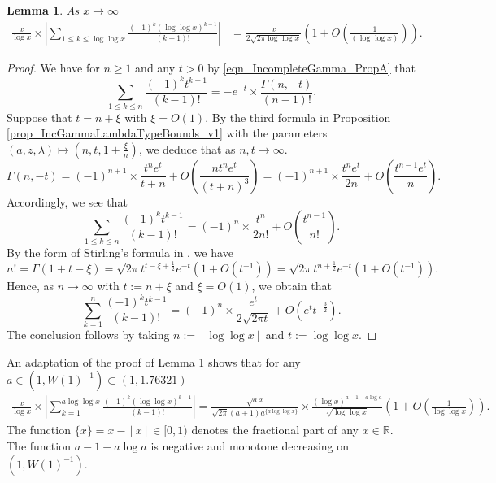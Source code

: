 \documentclass[11pt,reqno,a4letter]{article}
\newcommand{\hlocalref}[1]{\hyperref[#1]{\ref{#1}}}
\numberwithin{equation}{section}
\numberwithin{figure}{section}
\numberwithin{table}{section}
\newcommand{\cf}{\textit{cf.\ }}
\newcommand{\floor}[1]{\left\lfloor #1 \right\rfloor}
\theoremstyle{plain}
\newtheorem{lemma}[theorem]{Lemma}
\numberwithin{theorem}{section}
\theoremstyle{definition}
\begin{document}
\begin{lemma}
\label{lemma_ConvenientIncGammaFuncTypePartialSumAsymptotics_v2}
As $x \rightarrow \infty$  
\begin{align*}
\frac{x}{\log x} \times \left\lvert \sum_{1 \leq k \leq \log\log x} 
     \frac{(-1)^k (\log\log x)^{k-1}}{(k-1)!} \right\rvert 
     & = \frac{x}{2\sqrt{2\pi \log\log x}} 
     \left(1 + O\left(\frac{1}{(\log\log x)}\right)\right). 
\end{align*}
\end{lemma}
\begin{proof}
We have for $n \geq 1$ and any $t > 0$ by 
\eqref{eqn_IncompleteGamma_PropA} that 
\[
\sum_{1 \leq k \leq n} \frac{(-1)^k t^{k-1}}{(k-1)!} = -e^{-t} \times 
     \frac{\Gamma(n, -t)}{(n-1)!}. 
\]
Suppose that $t = n + \xi$ with $\xi = O(1)$. 
By the third formula 
in Proposition \hlocalref{prop_IncGammaLambdaTypeBounds_v1} 
with the parameters $(a, z, \lambda) \mapsto \left(n, t, 1 + \frac{\xi}{n}\right)$, 
we deduce that as $n,t \rightarrow \infty$. 
\begin{equation*}
\Gamma(n, -t) = (-1)^{n+1} \times \frac{t^n e^{t}}{t+n} + 
     O\left(\frac{n t^n e^{t}}{(t+n)^3}\right) = 
     (-1)^{n+1} \times \frac{t^n e^t}{2n} + O\left(\frac{t^{n-1} e^t}{n}\right). 
\end{equation*}
Accordingly, we see that 
\[
\sum_{1 \leq k \leq n} \frac{(-1)^k t^{k-1}}{(k-1)!} = 
     (-1)^{n} \times \frac{t^n}{2n!} + O\left(\frac{t^{n-1}}{n!}\right). 
\]
By the form of Stirling's formula in \cite[\cf Eq.\ (5.11.8)]{NISTHB}, we have 
\[
n! = \Gamma(1 + t - \xi) = \sqrt{2\pi} t^{t-\xi+\frac{1}{2}} e^{-t} \left(1 + O\left(t^{-1}\right)\right) = 
     \sqrt{2\pi} t^{n+\frac{1}{2}} e^{-t} \left(1 + O\left(t^{-1}\right)\right). 
\]
Hence, as $n \rightarrow \infty$ with $t := n + \xi$ and $\xi = O(1)$, we obtain that 
\[
\sum_{k=1}^{n} \frac{(-1)^k t^{k-1}}{(k-1)!} = (-1)^n \times \frac{e^t}{2 \sqrt{2\pi t}} + 
     O\left(e^t t^{-\frac{3}{2}}\right). 
\]
The conclusion follows by taking $n := \floor{\log\log x}$ and $t := \log\log x$. 
\end{proof}

An adaptation of the proof of 
Lemma \hlocalref{lemma_ConvenientIncGammaFuncTypePartialSumAsymptotics_v2} 
shows that for any $a \in \left(1, W(1)^{-1}\right) \subset (1, 1.76321)$ 
\begin{align*}
\frac{x}{\log x} \times \left\lvert \sum_{k=1}^{a \log\log x} 
     \frac{(-1)^{k} (\log\log x)^{k-1}}{(k-1)!} 
     \right\rvert = 
     \frac{\sqrt{a} x}{\sqrt{2\pi}(a+1) a^{\{a\log\log x\}}} 
     \times \frac{(\log x)^{a-1-a\log a}}{\sqrt{\log\log x}} 
     \left(1 + O\left(\frac{1}{\log\log x}\right)\right). 
\end{align*}
The function $\{x\} = x - \floor{x} \in [0, 1)$ denotes the fractional part of 
any $x \in \mathbb{R}$.
The function $a-1-a\log a$ is negative and monotone decreasing on 
$\left(1, W(1)^{-1}\right)$. 
\end{document}
